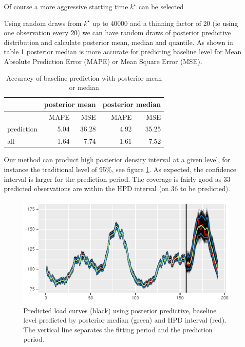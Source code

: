 \documentclass[journal]{IEEEtran}
\begin{document}
Of course a more aggressive starting time $k^\star$   can be selected


Using random draws from $k^\star$ up to 40000 and a thinning factor of
20 (ie using one observation every 20) we can have random draws of
posterior predictive distribution and calculate posterior mean, median
and quantile. As shown in table \ref{tab:map} posterior median is more
accurate for predicting baseline level for Mean Absolute Prediction
Error (MAPE) or Mean Square Error (MSE).
\begin{table}
 \begin{center}
  \begin{tabular}{lrrrr}\hline\hline
&\multicolumn{2}{c}{posterior mean}&\multicolumn{2}{c}{posterior median}\\\hline
          &MAPE & MSE & MAPE&  MSE\\\hline
prediction&5.04&36.28&4.92&35.25\\
all       &1.64& 7.74&1.61& 7.52\\\hline
\end{tabular}
  \end{center}
\caption{Accuracy of baseline prediction with posterior mean or median}
  \label{tab:map}
\end{table}

Our method can product high posterior density interval at a given
level, for instance the traditional level of 95\%, see figure
\ref{fig:ICY}. As expected, the confidence interval is larger for the
prediction period. The coverage is fairly good as 33 predicted
observations are within the HPD interval (on 36 to be predicted).
\begin{figure}[!h]
  \centering
  \includegraphics{ICY}
  \caption{Predicted load curves (black) using posterior predictive,
    baseline level predicted by posterior median (green) and HPD
    interval (red). The vertical line separates the fitting period and
    the prediction period.}
  \label{fig:ICY}
\end{figure}
\end{document}
